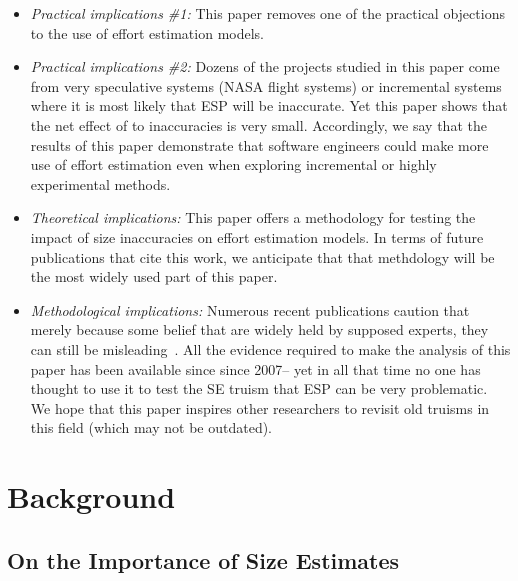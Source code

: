 \documentclass[final,twocolumn]{elsarticle}
\newcommand{\bi}{\begin{itemize}[leftmargin=0.4cm]}
\newcommand{\ei}{\end{itemize}}
\theoremstyle{break}
\begin{document}
\bi
\item {\em Practical implications \#1:} This paper removes
  one of the practical objections to the use of effort estimation models.
\item {\em Practical implications \#2:} Dozens of the projects studied in this paper come from very speculative systems (NASA flight systems) or incremental
  systems where it is most likely that ESP will be inaccurate. Yet this paper shows that the net effect
  of to inaccuracies is very small.
  Accordingly, we say that
  the results of this paper demonstrate
  that software engineers could make more use of effort estimation even when exploring incremental or highly experimental methods. 
  \item {\em Theoretical implications:} This paper offers a methodology for testing the impact
  of size inaccuracies on effort estimation models. In terms of 
  future publications that cite this work, we anticipate that that 
  methdology will be the most widely used part of this paper.
  \item {\em Methodological implications:}
   Numerous
  recent publications caution that merely because some  belief that are widely held by
  supposed  experts, they can still be misleading~\cite{jorgensen09,Menzies2016,Menzies2016b,passos11,prem16,betten14,yang13,me12d,ray2014lang}.  
   All the evidence required to make the analysis of
  this paper has been available since since 2007-- yet in all that
  time no one has thought to use it to test the
  SE truism that  ESP can be very problematic.
  We hope that this paper inspires other researchers to revisit
  old truisms in this field (which may not be outdated).
  \ei
  
  
  \section{Background}
  



\subsection{On the Importance of Size Estimates}
\end{document}
